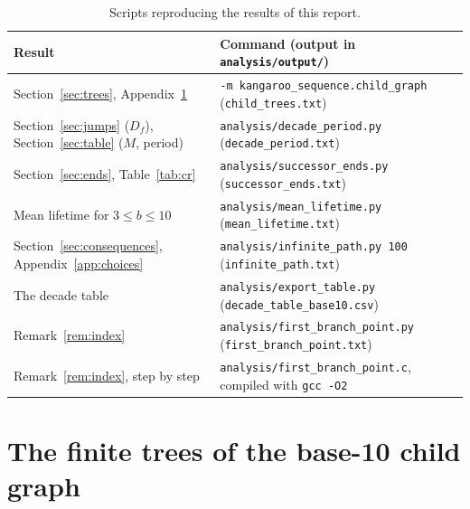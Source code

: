 \begin{table}[ht]
  \centering
  \footnotesize
  \begin{tabular}{@{}ll@{}}
    \toprule
    Result & Command (output in \texttt{analysis/output/}) \\
    \midrule
    Section~\ref{sec:trees}, Appendix~\ref{app:trees}
      & \texttt{-m kangaroo\_sequence.child\_graph} (\texttt{child\_trees.txt}) \\
    Section~\ref{sec:jumps} ($D_f$), Section~\ref{sec:table} ($M$, period)
      & \texttt{analysis/decade\_period.py} (\texttt{decade\_period.txt}) \\
    Section~\ref{sec:ends}, Table~\ref{tab:cr}
      & \texttt{analysis/successor\_ends.py} (\texttt{successor\_ends.txt}) \\
    Mean lifetime for $3 \le b \le 10$
      & \texttt{analysis/mean\_lifetime.py} (\texttt{mean\_lifetime.txt}) \\
    Section~\ref{sec:consequences}, Appendix~\ref{app:choices}
      & \texttt{analysis/infinite\_path.py 100} (\texttt{infinite\_path.txt}) \\
    The decade table
      & \texttt{analysis/export\_table.py} (\texttt{decade\_table\_base10.csv}) \\
    Remark~\ref{rem:index}
      & \texttt{analysis/first\_branch\_point.py} (\texttt{first\_branch\_point.txt}) \\
    Remark~\ref{rem:index}, step by step
      & \texttt{analysis/first\_branch\_point.c}, compiled with \texttt{gcc -O2} \\
    \bottomrule
  \end{tabular}
  \caption{Scripts reproducing the results of this report.}
  \label{tab:reproduce}
\end{table}

\section{The finite trees of the base-10 child graph}
\label{app:trees}

